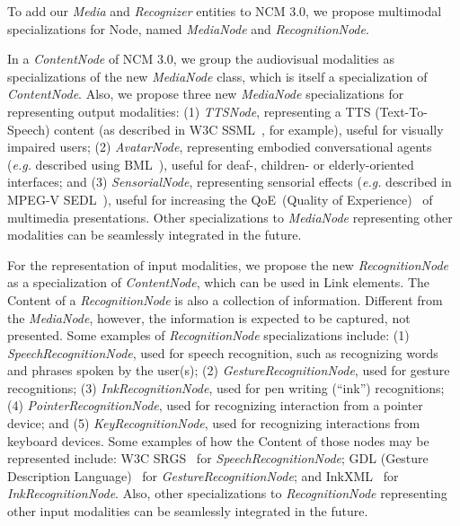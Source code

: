 \documentclass[
  doutorado,
  american
]{ThesisPUC}
\begin{document}
To add our \textit{Media} and \textit{Recognizer} entities to NCM 3.0, we 
propose multimodal 
specializations for Node, named \textit{MediaNode} and \textit{RecognitionNode}.

In a \textit{ContentNode} of NCM 3.0, we group the audiovisual modalities as 
specializations of the new \textit{MediaNode} class, which is itself a 
specialization of 
\textit{ContentNode}. Also, we propose three new \textit{MediaNode} 
specializations for 
representing output modalities: (1) \textit{TTSNode}, representing a TTS 
(Text-To-Speech) content (as described in W3C 
SSML~\cite{daniel_c._burnett_speech_2010}, for example), useful 
for visually impaired users; (2) \textit{AvatarNode}, representing embodied 
conversational agents (\textit{e.g.} described using BML~\cite{vilhjalmsson_behavior_2007}), useful for deaf-, 
children- or elderly-oriented interfaces; and (3) \textit{SensorialNode}, 
representing 
sensorial effects (\textit{e.g.} described in MPEG-V SEDL~\cite{iso/iec_iso/iec_2013}), useful for increasing 
the QoE~(Quality of Experience)~\cite{ghinea_mulsemedia:_2014} of multimedia presentations. Other 
specializations to \textit{MediaNode} 
representing other modalities can be seamlessly integrated in the future.

For the representation of input modalities, we propose the new 
\textit{RecognitionNode} 
as a specialization of \textit{ContentNode}, which can be used in Link 
elements. The Content of a \textit{RecognitionNode} is also a collection of 
information. Different from the \textit{MediaNode}, however, the information is 
expected to be captured, not presented. Some examples of 
\textit{RecognitionNode} specializations include: (1) 
\textit{SpeechRecognitionNode}, used for speech recognition, such as 
recognizing words 
and phrases spoken by the user(s); (2) \textit{GestureRecognitionNode}, used 
for gesture 
recognitions; (3) \textit{InkRecognitionNode}, used for pen writing (“ink”) 
recognitions; (4) \textit{PointerRecognitionNode}, used for recognizing 
interaction from 
a pointer device; and (5) \textit{KeyRecognitionNode}, used for recognizing 
interactions 
from keyboard devices. Some examples of how the Content of those nodes may be 
represented include: W3C SRGS~\cite{andrew_hunt_speech_2004} for \textit{SpeechRecognitionNode}; GDL 
(Gesture 
Description Language)~\cite{hachaj_semantic_2012} for 
\textit{GestureRecognitionNode}; and InkXML~\cite{w3c_ink_2011} for 
\textit{InkRecognitionNode}. Also, other specializations to 
\textit{RecognitionNode} representing 
other input modalities can be seamlessly integrated in the future.
\end{document}
